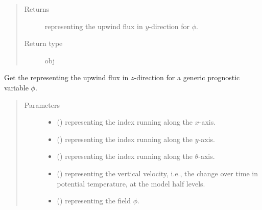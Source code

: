 \documentclass[letterpaper,10pt,english]{sphinxmanual}
\begin{document}
\begin{fulllineitems}
\begin{fulllineitems}
\begin{quote}
\begin{description}
\begin{itemize}
\end{itemize}

\item[{Returns}] \leavevmode
{} representing the upwind flux in \(y\)-direction for \(\phi\).

\item[{Return type}] \leavevmode
obj

\end{description}\end{quote}

\end{fulllineitems}


\begin{fulllineitems}
\label{\detokenize{api:dycore.flux_isentropic_upwind.FluxIsentropicUpwind._get_upwind_flux_z}}
Get the  representing the upwind flux in \(z\)-direction for a generic
prognostic variable \(\phi\).
\begin{quote}\begin{description}
\item[{Parameters}] \leavevmode\begin{itemize}
\item {} 
 () \textendash{}  representing the index running along the \(x\)-axis.

\item {} 
 () \textendash{}  representing the index running along the \(y\)-axis.

\item {} 
 () \textendash{}  representing the index running along the \(\theta\)-axis.

\item {} 
 () \textendash{}  representing the vertical velocity, i.e., the change over time in
potential temperature, at the model half levels.

\item {} 
 () \textendash{}  representing the field \(\phi\).


\end{itemize}
\end{description}
\end{quote}
\end{fulllineitems}
\end{fulllineitems}
\end{document}

